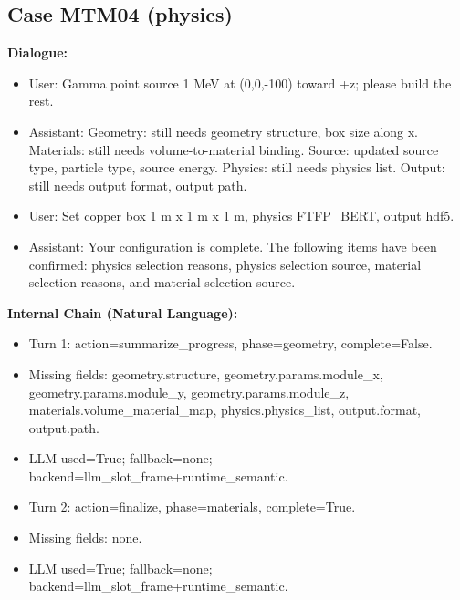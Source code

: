 \documentclass[11pt]{ctexart}
\begin{document}
\subsection{Case MTM04 (physics)}
\textbf{Dialogue:}
\begin{itemize}
\item User: Gamma point source 1 MeV at (0,0,-100) toward +z; please build the rest.
\item Assistant: Geometry: still needs geometry structure, box size along x. Materials: still needs volume-to-material binding. Source: updated source type, particle type, source energy. Physics: still needs physics list. Output: still needs output format, output path.
\item User: Set copper box 1 m x 1 m x 1 m, physics FTFP\_BERT, output hdf5.
\item Assistant: Your configuration is complete. The following items have been confirmed: physics selection reasons, physics selection source, material selection reasons, and material selection source.
\end{itemize}
\textbf{Internal Chain (Natural Language):}
\begin{itemize}
\item Turn 1: action=summarize\_progress, phase=geometry, complete=False.
\item Missing fields: geometry.structure, geometry.params.module\_x, geometry.params.module\_y, geometry.params.module\_z, materials.volume\_material\_map, physics.physics\_list, output.format, output.path.
\item LLM used=True; fallback=none; backend=llm\_slot\_frame+runtime\_semantic.
\item Turn 2: action=finalize, phase=materials, complete=True.
\item Missing fields: none.
\item LLM used=True; fallback=none; backend=llm\_slot\_frame+runtime\_semantic.
\end{itemize}
\end{document}
